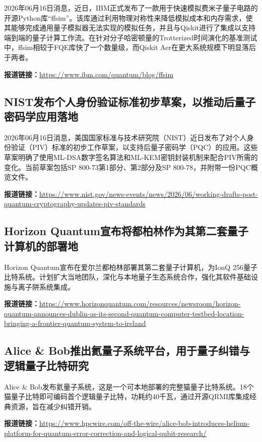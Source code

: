 \documentclass[12pt,a4paper]{ctexart}
\begin{document}
2026年06月16日消息，近日，IBM正式发布了一款用于快速模拟费米子量子电路的开源Python库“ffsim”。该库通过利用物理对称性来降低模拟成本和内存需求，使其能够完成通用量子模拟器无法实现的模拟任务，并且与Qiskit进行了集成以支持端到端的量子计算工作流。在针对分子哈密顿量的Trotterized时间演化的基准测试中，ffsim相较于FQE库快了一个数量级，而Qiskit Aer在更大系统规模下明显落后于两者。

\noindent\textbf{报道链接：}\url{https://www.ibm.com/quantum/blog/ffsim}

\subsection{ NIST发布个人身份验证标准初步草案，以推动后量子密码学应用落地 }

2026年06月16日消息，美国国家标准与技术研究院（NIST）近日发布了对个人身份验证（PIV）标准的初步工作草案，以支持后量子密码学（PQC）的应用。这些草案明确了使用ML-DSA数字签名算法和ML-KEM密钥封装机制来配合PIV所需的变化。当前草案包括SP 800-73第1部分、第2部分及SP 800-78，并附带一份PQC概览文件。

\noindent\textbf{报道链接：}\url{https://www.nist.gov/news-events/news/2026/06/working-drafts-post-quantum-cryptography-updates-piv-standards}

\subsection{ Horizon Quantum宣布将都柏林作为其第二套量子计算机的部署地 }

Horizon Quantum宣布在爱尔兰都柏林部署其第二套量子计算机，为IonQ 256量子比特系统。计划扩大当地团队，深化与本地量子生态系统合作，强化其软件基础设施与离子阱系统集成。

\noindent\textbf{报道链接：}\url{https://www.horizonquantum.com/resources/newsroom/horizon-quantum-announces-dublin-as-its-second-quantum-computer-testbed-location-bringing-a-frontier-quantum-system-to-ireland}

\subsection{ Alice \& Bob推出氦量子系统平台，用于量子纠错与逻辑量子比特研究 }

Alice \& Bob发布氦量子系统，这是一个可本地部署的完整猫量子比特系统。18个猫量子比特即可编码首个逻辑量子比特，功耗约40千瓦，通过开源QRMI库集成经典资源，旨在减少纠错开销。

\noindent\textbf{报道链接：}\url{https://www.hpcwire.com/off-the-wire/alice-bob-introduces-helium-platform-for-quantum-error-correction-and-logical-qubit-research/}
\end{document}
